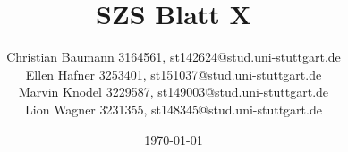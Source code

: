 \documentclass[a4paper, 15pt]{scrartcl}
\title{SZS Blatt X}
\author{
	Christian Baumann 3164561, st142624@stud.uni-stuttgart.de \\ 
	Ellen Hafner 3253401, st151037@stud.uni-stuttgart.de \\ 
	Marvin Knodel 3229587, st149003@stud.uni-stuttgart.de\\ 
	Lion Wagner 3231355, st148345@stud.uni-stuttgart.de}
\date{\today}
\begin{document}
	\maketitle
	\newpage
		\mbox{}
		
	\newpage
		
	\newpage
		
	\newpage
		
\end{document}

